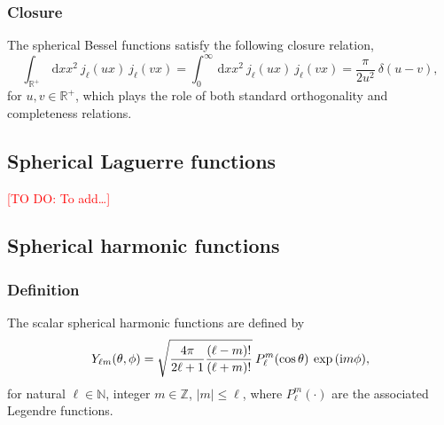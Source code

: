 \documentclass[a4paper,11pt]{article}
\newcommand{\naturals}{\ensuremath{{\mathbb{N}}}}
\newcommand{\integers}{\ensuremath{{\mathbb{Z}}}}
\newcommand{\realsnn}{\ensuremath{{\mathbb{R}^{+}}}}
\newcommand{\dx}{\ensuremath{\mathrm{\,d}}}
\newcommand{\im}{{\rm i}}
\newcommand{\todo}[1]{\textcolor{red}{[TO DO: #1]}}
\begin{document}
\subsubsection{Closure}

The spherical Bessel functions satisfy the following closure relation,
\begin{equation}
  \int_{\realsnn} \dx x x^2 \: j_\ell(ux) \: j_\ell(vx) 
  =
  \int_0^\infty \dx x x^2 \: j_\ell(ux) \: j_\ell(vx) 
  =
  \frac{\pi}{2u^2} \: 
  \delta(u-v)
  ,
\end{equation}
for $u,v \in \realsnn$, which plays the role of both standard orthogonality and completeness relations.


\subsection{Spherical Laguerre functions}

\todo{To add\ldots}

\subsection{Spherical harmonic functions}


\subsubsection{Definition}

The scalar spherical harmonic functions are defined by
\begin{equation}
  Y_{\ell m}(\theta, \phi) = 
  \sqrt{\frac{4\pi}{2\ell+1} \frac{(\ell-m)!}{(\ell+m)!}} \:
  P_\ell^m(\cos\theta) \:
  \exp{(\im m \phi)}
  ,
\end{equation}
for natural $\ell \in \naturals$, integer $m \in \integers$, $\vert m \vert \leq \ell$, where $P_\ell^m(\cdot)$ are the associated Legendre functions.
\end{document}
